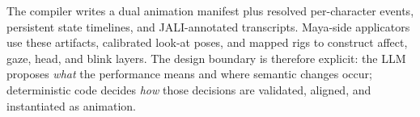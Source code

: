 The compiler writes a dual animation manifest plus resolved per-character events, persistent state timelines, and JALI-annotated transcripts. Maya-side applicators use these artifacts, calibrated look-at poses, and mapped rigs to construct affect, gaze, head, and blink layers. The design boundary is therefore explicit: the LLM proposes \textit{what} the performance means and where semantic changes occur; deterministic code decides \textit{how} those decisions are validated, aligned, and instantiated as animation.
